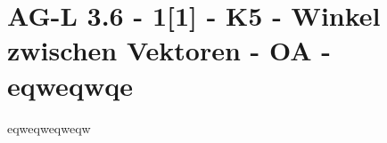 \section{AG-L 3.6 - 1[1] - K5 - Winkel zwischen Vektoren - OA - eqweqwqe}

\begin{beispiel}[AG-L 3.6]{1}
eqweqweqweqw
\end{beispiel}